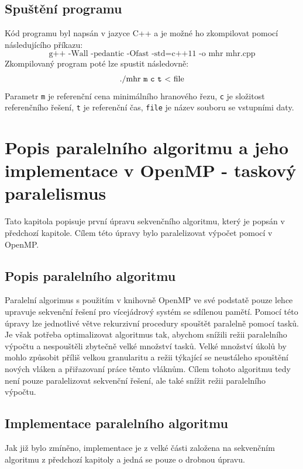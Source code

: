 \documentclass{article}
\begin{document}
\subsection{Spuštění programu}
Kód programu byl napsán v jazyce C++ a je možné ho zkompilovat pomocí následujícího příkazu: $$\text{g++ -Wall -pedantic -Ofast -std=c++11 -o mhr mhr.cpp}$$ 
Zkompilovaný program poté lze spustit následovně:
$$\text{./mhr \texttt{m} \texttt{c} \texttt{t} \textless \ file}$$
Parametr \texttt{m} je referenční cena minimálního hranového řezu, \texttt{c} je složitost referenčního řešení, \texttt{t} je referenční čas, \texttt{file} je název souboru se vstupními daty. 


\section{Popis paralelního algoritmu a jeho implementace v OpenMP - taskový paralelismus}

Tato kapitola popisuje první úpravu sekvenčního algoritmu, který je popsán v předchozí kapitole. Cílem této úpravy bylo paralelizovat výpočet pomocí  v OpenMP.

\subsection{Popis paralelního algoritmu}

Paralelní algorimus s použitím  v knihovně OpenMP ve své podstatě pouze lehce upravuje sekvenční řešení pro vícejádrový systém se sdílenou pamětí. Pomocí této úpravy lze jednotlivé větve rekurzivní procedury spouštět paralelně pomocí tasků. Je však potřeba optimalizovat algoritmus tak, abychom snížili režii paralelního výpočtu a nespouštěli zbytečně velké množství tasků. Velké množství úkolů by mohlo způsobit příliš velkou granularitu a režii týkající se neustáleho spouštění nových vláken a přiřazovaní práce těmto vláknům. Cílem tohoto algoritmu tedy není pouze paralelizovat sekvenční řešení, ale také snížit režii paralelního výpočtu.

\subsection{Implementace paralelního algoritmu}
Jak již bylo zmíněno, implementace  je z velké části založena na sekvenčním algoritmu z předchozí kapitoly a jedná se pouze o drobnou úpravu. 
\end{document}
